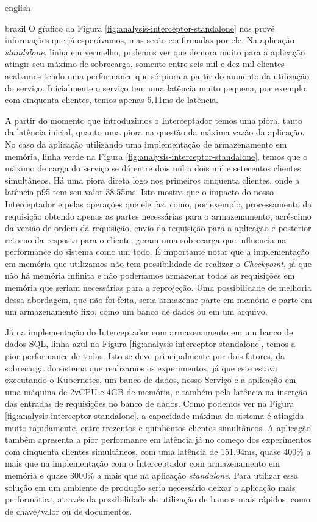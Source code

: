 \begin{otherlanguage*}{english}
\begin{otherlanguage*}{brazil}
O gŕafico da Figura \ref{fig:analysis-interceptor-standalone} nos provê informações que já
esperávamos, mas serão confirmadas por ele. Na aplicação \textit{standalone}, linha em vermelho,
podemos ver que demora muito para a aplicação atingir seu máximo de sobrecarga, somente entre
seis mil e dez mil clientes acabamos tendo uma performance que só piora a partir do aumento
da utilização do serviço. Inicialmente o serviço tem uma latência muito pequena, por exemplo,
com cinquenta clientes, temos apenas 5.11ms de latência.

A partir do momento que introduzimos o Interceptador temos uma piora, tanto da latência inicial,
quanto uma piora na questão da máxima vazão da aplicação. No caso da aplicação utilizando uma
implementação de armazenamento em memória, linha verde na Figura \ref{fig:analysis-interceptor-standalone},
temos que o máximo de carga do serviço se dá entre dois mil a dois mil e setecentos clientes
simultâneos. Há uma piora direta logo nos primeiros cinquenta clientes, onde a latência
p95 tem seu valor 38.55ms. Isto mostra que o impacto do nosso Interceptador e pelas
operações que ele faz, como, por exemplo, processamento da requisição obtendo apenas as
partes necessárias para o armazenamento, acréscimo da versão de ordem da requisição,
envio da requisição para a aplicação e posterior retorno da resposta para o cliente, geram
uma sobrecarga que influencia na performance do sistema como um todo. É importante notar que
a implementação em memória que utilizamos não tem possibilidade de realizar o \textit{Checkpoint},
já que não há memória infinita e não poderíamos armazenar todas as requisições em memória
que seriam necessárias para a reprojeção. Uma possibilidade de melhoria dessa abordagem,
que não foi feita, seria armazenar parte em memória e parte em um armazenamento fixo, como
um banco de dados ou em um arquivo.

Já na implementação do Interceptador com armazenamento em um banco de dados SQL, linha azul
na Figura \ref{fig:analysis-interceptor-standalone}, temos a pior performance de todas. Isto
se deve principalmente por dois fatores, da sobrecarga do sistema que realizamos os experimentos,
já que este estava executando o Kubernetes, um banco de dados, nosso Serviço e a aplicação
em uma máquina de 2vCPU e 4GB de memória, e também pela latência na inserção das entradas
de requisições no banco de dados. Como podemos ver na Figura \ref{fig:analysis-interceptor-standalone},
a capacidade máxima do sistema é atingida muito rapidamente, entre trezentos e quinhentos
clientes simultâneos. A aplicação também apresenta a pior performance em latência já no
começo dos experimentos com cinquenta clientes simultâneos, com uma latência de 151.94ms,
quase 400\% a mais que na implementação com o Interceptador com armazenamento em memória e
quase 3000\% a mais que na aplicação \textit{standalone}. Para utilizar essa solução em
um ambiente de produção seria necessário deixar a aplicação mais performática, através da
possibilidade de utilização de bancos mais rápidos, como de chave/valor ou de documentos.


\end{otherlanguage*}
\end{otherlanguage*}
